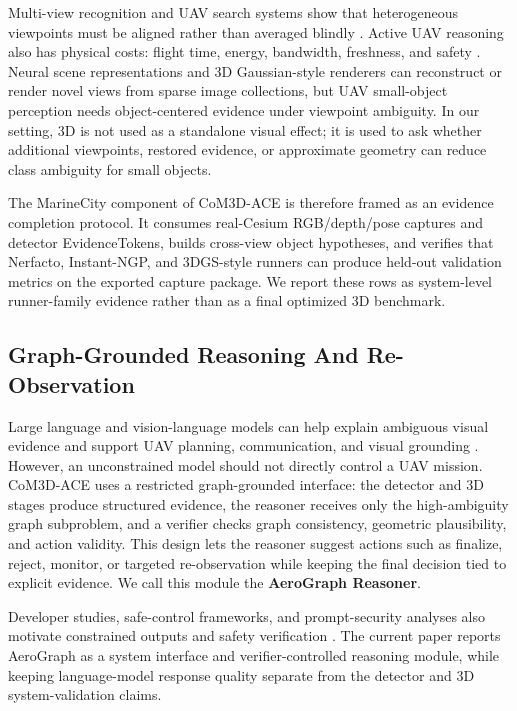 Multi-view recognition and UAV search systems show that heterogeneous
viewpoints must be aligned rather than averaged blindly
\cite{zhang2024attention4align,cai2025neusis,maletic2025spatialsemantic}.
Active UAV reasoning also has physical costs: flight time, energy, bandwidth,
freshness, and safety \cite{jeon2025symbolicrlbdi,emami2026frsicl}. Neural
scene representations and 3D Gaussian-style renderers can reconstruct or render
novel views from sparse image collections, but UAV small-object perception
needs object-centered evidence under viewpoint ambiguity. In our setting, 3D is
not used as a standalone visual effect; it is used to ask whether additional
viewpoints, restored evidence, or approximate geometry can reduce class
ambiguity for small objects.

The MarineCity component of CoM3D-ACE is therefore framed as an evidence
completion protocol. It consumes real-Cesium RGB/depth/pose captures and
detector EvidenceTokens, builds cross-view object hypotheses, and verifies that
Nerfacto, Instant-NGP, and 3DGS-style runners can produce held-out validation
metrics on the exported capture package. We report these rows as system-level
runner-family evidence rather than as a final optimized 3D benchmark.

\subsection{Graph-Grounded Reasoning And Re-Observation}
\label{sec:rw_reasoning}

Large language and vision-language models can help explain ambiguous visual
evidence and support UAV planning, communication, and visual grounding
\cite{tian2025uavsmeetllms,emami2026llmuavsurvey,chen2025uavvisualgrounding}.
However, an unconstrained model should not directly control a UAV mission.
CoM3D-ACE uses a restricted graph-grounded interface: the detector and 3D stages
produce structured evidence, the reasoner receives only the high-ambiguity graph
subproblem, and a verifier checks graph consistency, geometric plausibility, and
action validity. This design lets the reasoner suggest actions such as
finalize, reject, monitor, or targeted re-observation while keeping the final
decision tied to explicit evidence. We call this module the
\textbf{AeroGraph Reasoner}.

Developer studies, safe-control frameworks, and prompt-security analyses also
motivate constrained outputs and safety verification
\cite{chen2025llmuavprojects,zhao2026sagellm,emami2026promptstoprotection}.
The current paper reports AeroGraph as a system interface and verifier-controlled
reasoning module, while keeping language-model response quality separate from
the detector and 3D system-validation claims.
